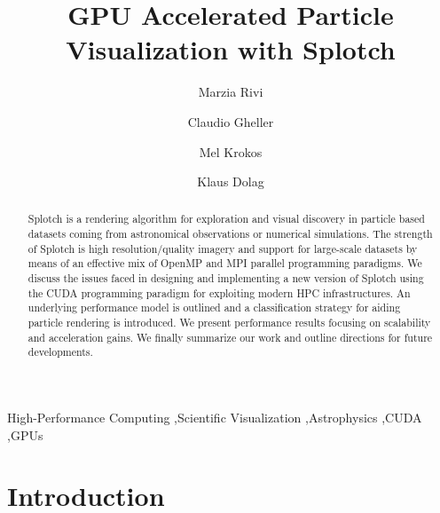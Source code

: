 \documentclass[1p]{elsarticle}
\begin{document}
\begin{frontmatter}

\title{GPU Accelerated Particle Visualization with Splotch}
\author[1]{Marzia Rivi} 
\address[1]{Department of Physics, Univ. of Oxford, OX1 3RH, United Kingdom}
\author[2]{Claudio Gheller}
\address[2]{ETH-CSCS, via Trevano 131, 6900 Lugano, Switzerland}
\author[3]{Mel Krokos}
\address[3]{School of Creative Technologies, Univ. of Portsmouth, PO1 2DJ, United Kingdom}
\author[4]{Klaus Dolag}
\address[4]{University Observatory Munich, Scheinerstr. 1, D-81679 Munich, Germany}

\begin{abstract}
Splotch is a rendering algorithm for exploration and visual discovery in particle based datasets coming from astronomical observations or numerical simulations. The strength of Splotch is high resolution/quality imagery and support for large-scale datasets by means of an effective mix of OpenMP and MPI parallel programming paradigms. We discuss the issues faced in designing and implementing a new version of Splotch using the CUDA programming paradigm for exploiting modern HPC infrastructures. An underlying performance model is outlined and a classification strategy for aiding particle rendering is introduced. We present performance results focusing on scalability and acceleration gains. We finally summarize our work and outline directions for future developments.
\end{abstract}

\begin{keyword}
High-Performance Computing \sep Scientific Visualization \sep Astrophysics \sep CUDA \sep GPUs
\end{keyword}

\end{frontmatter}

\section{Introduction}
\label{sec:intro}
\end{document}
